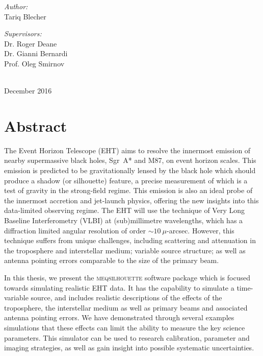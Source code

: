 \begin{titlepage}
\begin{minipage}{0.45\textwidth}
\begin{flushleft}\large 
\emph{Author:} \\
Tariq  {\sc Blecher}\\
\end{flushleft}
\end{minipage}
\begin{minipage}{0.45\textwidth}

\begin{flushright} \large
\emph{Supervisors:} \\
Dr. Roger {\sc Deane} \\
Dr. Gianni {\sc Bernardi} \\
Prof. Oleg {\sc Smirnov} \\
\end{flushright}
\end{minipage}\\[2cm]


{\large December 2016}

\end{titlepage}

\chapter*{Abstract} 
The Event Horizon Telescope (EHT) aims to resolve the innermost emission of nearby supermassive black holes, Sgr~A* and M87, on event horizon scales. This emission is predicted to be gravitationally lensed by the black hole which should produce a shadow (or silhouette) feature, a precise measurement of which is a test of gravity in the strong-field regime. This emission is also an ideal probe of the innermost accretion and jet-launch physics, offering the new insights into this data-limited observing regime. The EHT will use the technique of Very Long Baseline Interferometry (VLBI) at (sub)millimetre wavelengths, which has a diffraction limited angular resolution of order $\sim10~\mu$-arcsec. However, this technique suffers from unique challenges, including scattering and attenuation in the troposphere and interstellar medium; variable source structure; as well as antenna pointing errors comparable to the size of the primary beam. 


In this thesis, we present the \textsc{meqsilhouette} software package which is focused towards simulating realistic EHT data. It has the capability to simulate a time-variable source, and includes realistic descriptions of the effects of the troposphere, the interstellar medium as well as primary beams and associated antenna pointing errors. We have demonstrated through several examples simulations that these effects can limit the ability to measure the key science parameters. This simulator can be used to research calibration, parameter and imaging strategies, as well as gain insight into possible systematic uncertainties. 

